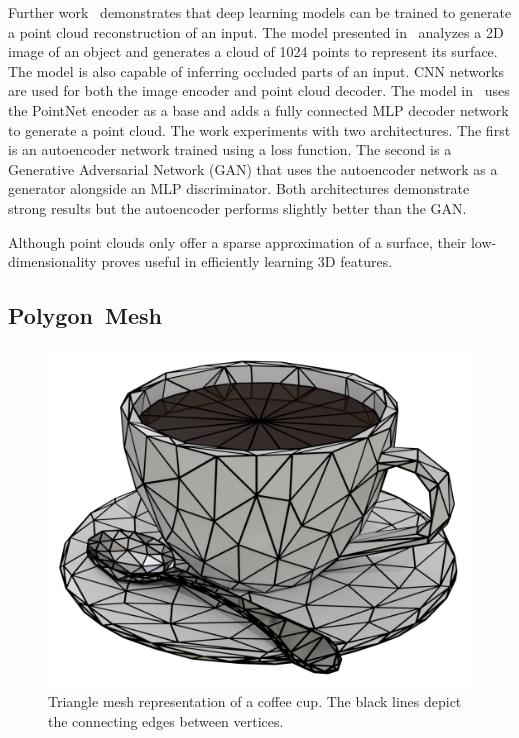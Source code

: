 Further work~\cite{Fan2017, Achlioptas2018} demonstrates that deep learning models can be trained to generate a point cloud reconstruction of an input. The model presented in~\cite{Fan2017} analyzes a 2D image of an object and generates a cloud of 1024 points to represent its surface. The model is also capable of inferring occluded parts of an input. CNN networks are used for both the image encoder and point cloud decoder. The model in~\cite{Achlioptas2018} uses the PointNet encoder as a base and adds a fully connected MLP decoder network to generate a point cloud. The work experiments with two architectures. The first is an autoencoder network trained using a loss function. The second is a Generative Adversarial Network (GAN) that uses the autoencoder network as a generator alongside an MLP discriminator. Both architectures demonstrate strong results but the autoencoder performs slightly better than the GAN.

Although point clouds only offer a sparse approximation of a surface, their low-dimensionality proves useful in efficiently learning 3D features.


\subsection{Polygon~Mesh}
\label{subsec:polygon_mesh}

\begin{figure}[ht]
	\centering
	\includegraphics[scale=0.2]{Images/Mesh Cup}
	\caption{Triangle mesh representation of a coffee cup. The black lines depict the connecting edges between vertices.}
	\label{fig:mesh_cup}
\end{figure}

